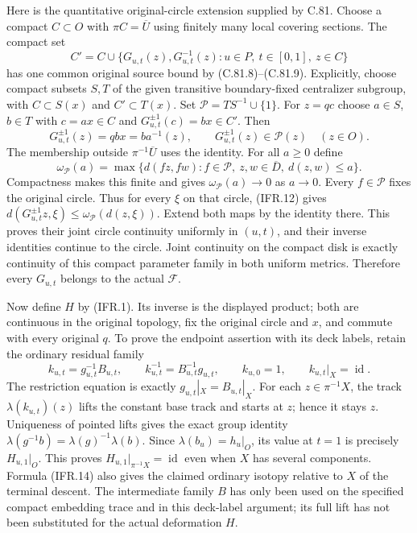 \documentclass[11pt,a4paper]{article}
\DeclareMathOperator{\id}{id}\DeclareMathOperator{\im}{im}
\begin{document}
Here is the quantitative original-circle extension supplied by C.81.
Choose a compact $C\subset O$ with $\pi C=\overline U$ using finitely
many local covering sections. The compact set
\[
 C'=C\cup\{G_{u,t}(z),G_{u,t}^{-1}(z):u\in P,\ t\in[0,1],\ z\in C\}
                                                               \tag{IFR.11}
\]
has one common original source bound by (C.81.8)--(C.81.9).
Explicitly, choose compact subsets $S,T$ of the given transitive
boundary-fixed centralizer subgroup, with $C\subset S(x)$ and
$C'\subset T(x)$. Set $\mathcal P=TS^{-1}\cup\{1\}$.
For $z=qc$ choose $a\in S$, $b\in T$ with
$c=ax\in C$ and $G_{u,t}^{\pm1}(c)=bx\in C'$. Then
\[
 G_{u,t}^{\pm1}(z)=qbx=ba^{-1}(z),\qquad
 G_{u,t}^{\pm1}(z)\in\mathcal P(z)\quad(z\in O).                \tag{IFR.12}
\]
The membership outside $\pi^{-1}\overline U$ uses the identity.
For all $a\geq0$ define
\[
 \omega_{\mathcal P}(a)=
 \max\{d(fz,fw):f\in\mathcal P,\ z,w\in\overline D,
                                                   \ d(z,w)\leq a\}.
                                                               \tag{IFR.13}
\]
Compactness makes this finite and gives $\omega_{\mathcal P}(a)\to0$
as $a\to0$. Every $f\in\mathcal P$ fixes the original circle.
Thus for every $\xi$ on that circle, (IFR.12) gives
$d(G_{u,t}^{\pm1}z,\xi)\leq\omega_{\mathcal P}(d(z,\xi))$.
Extend both maps by the identity there. This proves their joint
circle continuity uniformly in $(u,t)$, and their inverse identities
continue to the circle. Joint continuity on the compact disk is
exactly continuity of this compact parameter family in both uniform
metrics. Therefore every $G_{u,t}$ belongs to the actual $\mathscr F$.

Now define $H$ by (IFR.1). Its inverse is the displayed product;
both are continuous in the original topology, fix the original
circle and $x$, and commute with every original $q$.
To prove the endpoint assertion with its deck labels, retain the
ordinary residual family
\[
 k_{u,t}=g_{u,t}^{-1}B_{u,t},\qquad
 k_{u,t}^{-1}=B_{u,t}^{-1}g_{u,t},\qquad
 k_{u,0}=1,\qquad k_{u,t}|_X=\id.                              \tag{IFR.14}
\]
The restriction equation is exactly $g_{u,t}|_X=B_{u,t}|_X$.
For each $z\in\pi^{-1}X$, the track $\lambda(k_{u,t})(z)$
lifts the constant base track and starts at $z$; hence it stays $z$.
Uniqueness of pointed lifts gives the exact group identity
$\lambda(g^{-1}b)=\lambda(g)^{-1}\lambda(b)$.
Since $\lambda(b_u)=h_u|_O$, its value at $t=1$ is precisely
$H_{u,1}|_O$. This proves $H_{u,1}|_{\pi^{-1}X}=\id$ even when
$X$ has several components. Formula (IFR.14) also gives the claimed
ordinary isotopy relative to $X$ of the terminal descent.
The intermediate family $B$ has only been used on the specified
compact embedding trace and in this deck-label argument; its full
lift has not been substituted for the actual deformation $H$.
\end{document}
